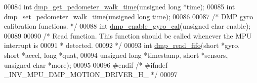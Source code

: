 \begin{DoxyCode}
00084 \textcolor{keywordtype}{int} \hyperlink{group___d_r_i_v_e_r_s_ga62c8e5e99986b0e60ca0dc9a9b9c3fcc}{dmp\_get\_pedometer\_walk\_time}(\textcolor{keywordtype}{unsigned} \textcolor{keywordtype}{long} *time);
00085 \textcolor{keywordtype}{int} \hyperlink{group___d_r_i_v_e_r_s_ga62f469269047f8cba16a2b7f5349acc0}{dmp\_set\_pedometer\_walk\_time}(\textcolor{keywordtype}{unsigned} \textcolor{keywordtype}{long} time);
00086 
00087 \textcolor{comment}{/* DMP gyro calibration functions. */}
00088 \textcolor{keywordtype}{int} \hyperlink{group___d_r_i_v_e_r_s_ga653ebcec6758f006dd89939e8f3c6ebb}{dmp\_enable\_gyro\_cal}(\textcolor{keywordtype}{unsigned} \textcolor{keywordtype}{char} enable);
00089 
00090 \textcolor{comment}{/* Read function. This function should be called whenever the MPU interrupt is}
00091 \textcolor{comment}{ * detected.}
00092 \textcolor{comment}{ */}
00093 \textcolor{keywordtype}{int} \hyperlink{group___d_r_i_v_e_r_s_ga02db5f25359abe84be002c543cdc3803}{dmp\_read\_fifo}(\textcolor{keywordtype}{short} *gyro, \textcolor{keywordtype}{short} *accel, \textcolor{keywordtype}{long} *quat,
00094     \textcolor{keywordtype}{unsigned} \textcolor{keywordtype}{long} *timestamp, \textcolor{keywordtype}{short} *sensors, \textcolor{keywordtype}{unsigned} \textcolor{keywordtype}{char} *more);
00095 
00096 \textcolor{preprocessor}{#endif  }\textcolor{comment}{/* #ifndef \_INV\_MPU\_DMP\_MOTION\_DRIVER\_H\_ */}\textcolor{preprocessor}{}
00097 
\end{DoxyCode}
